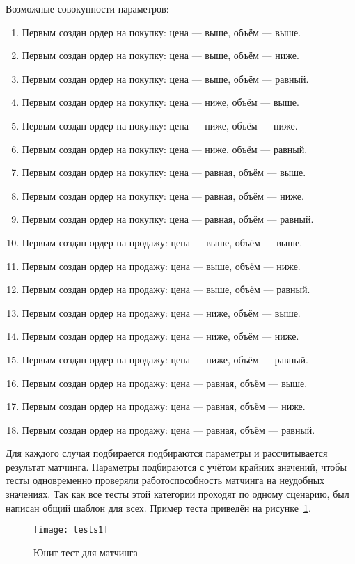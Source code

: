 Возможные совокупности параметров:
\begin{enumerate}
    \item Первым создан ордер на покупку: цена — выше, объём — выше.
    \item Первым создан ордер на покупку: цена — выше, объём — ниже.
    \item Первым создан ордер на покупку: цена — выше, объём — равный.
    \item Первым создан ордер на покупку: цена — ниже, объём — выше.
    \item Первым создан ордер на покупку: цена — ниже, объём — ниже.
    \item Первым создан ордер на покупку: цена — ниже, объём — равный.
    \item Первым создан ордер на покупку: цена — равная, объём — выше.
    \item Первым создан ордер на покупку: цена — равная, объём — ниже.
    \item Первым создан ордер на покупку: цена — равная, объём — равный.
    \item Первым создан ордер на продажу: цена — выше, объём — выше.
    \item Первым создан ордер на продажу: цена — выше, объём — ниже.
    \item Первым создан ордер на продажу: цена — выше, объём — равный.
    \item Первым создан ордер на продажу: цена — ниже, объём — выше.
    \item Первым создан ордер на продажу: цена — ниже, объём — ниже.
    \item Первым создан ордер на продажу: цена — ниже, объём — равный.
    \item Первым создан ордер на продажу: цена — равная, объём — выше.
    \item Первым создан ордер на продажу: цена — равная, объём — ниже.
    \item Первым создан ордер на продажу: цена — равная, объём — равный.
\end{enumerate}

Для каждого случая подбирается подбираются параметры и рассчитывается результат матчинга. Параметры подбираются с учётом крайних значений, чтобы тесты одновременно проверяли работоспособность матчинга на неудобных значениях. Так как все тесты этой категории проходят по одному сценарию, был написан общий шаблон для всех. Пример теста приведён на рисунке~\ref{fig:unit_test}.

\begin{figure}[ht]
    \centering
    \texttt{[image: tests1]}
    \caption{Юнит-тест для матчинга}\label{fig:unit_test}
\end{figure}

